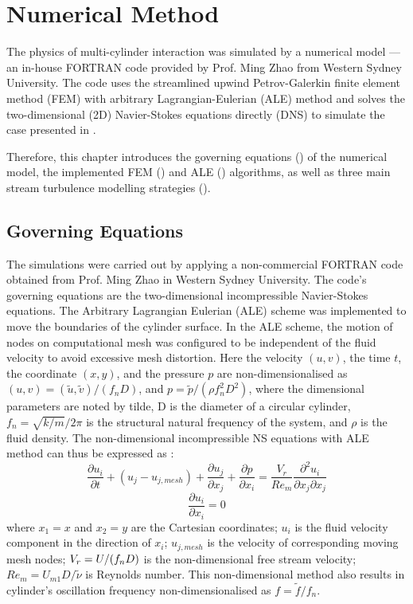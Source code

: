 \chapter{Numerical Method} \label{cha Numerical Method}

The physics of multi-cylinder interaction was simulated by a numerical model --- an in-house FORTRAN code provided by Prof. Ming Zhao from Western Sydney University. The code uses the streamlined upwind Petrov-Galerkin finite element method (FEM) with arbitrary Lagrangian-Eulerian (ALE) method and solves the two-dimensional (2D) Navier-Stokes equations directly (DNS) to simulate the case presented in .

Therefore, this chapter introduces the governing equations () of the numerical model, the implemented FEM () and ALE () algorithms, as well as three main stream turbulence modelling strategies ().

\section{Governing Equations} \label{sec governing eq}

The simulations were carried out by applying a non-commercial FORTRAN code obtained from Prof. Ming Zhao in Western Sydney University. The code's governing equations are the two-dimensional incompressible Navier-Stokes equations. The Arbitrary Lagrangian Eulerian (ALE) scheme was implemented to move the boundaries of the cylinder surface. In the ALE scheme, the motion of nodes on computational mesh was configured to be independent of the fluid velocity to avoid excessive mesh distortion. Here the velocity $ (u,v) $, the time $ t $, the coordinate $ (x,y) $, and the pressure $ p $ are non-dimensionalised as $ (u,v)=(\widetilde{u},\widetilde{v})/(f_nD) $, and $ p=\widetilde{p}/(\rho f^2_n D^2) $, where the dimensional parameters are noted by tilde, D is the diameter of a circular cylinder, $ f_n=\sqrt{k/m}/2\pi$ is the structural natural frequency of the system, and $ \rho $ is the fluid density. The non-dimensional incompressible NS equations with ALE method can thus be expressed as : 
\begin{equation} \label{eqns2d}
	\frac{\partial u_i}{\partial t} + (u_{j}-u_{j,mesh})+\frac{\partial u_j}{\partial x_j} + \frac{\partial p}{\partial x_i} = \frac{ V_r}{Re_m} \frac{\partial^2 u_i}{\partial x_j \partial x_j}
\end{equation}
\begin{equation} \label{eqpoison}
	\frac{\partial u_i}{\partial x_i}=0
\end{equation}
where $ x_1=x $ and $ x_2=y $ are the Cartesian coordinates; $ u_i $ is the fluid velocity component in the direction of $ x_i $; $ u_{j,mesh} $ is the velocity of corresponding moving mesh nodes; $ V_r= U/(f_nD)$ is the non-dimensional free stream velocity; $ Re_m=U_{m1}D/ \widetilde{\nu} $ is Reynolds number. This non-dimensional method also results in cylinder's oscillation frequency non-dimensionalised as $ f=\widetilde{f}/f_n $.


